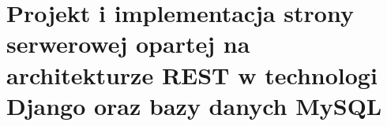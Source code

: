 
\chapter{Projekt i implementacja strony serwerowej opartej na architekturze REST w technologi Django oraz bazy danych MySQL}

